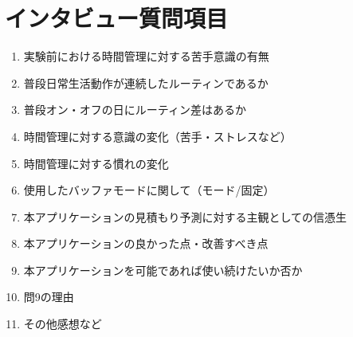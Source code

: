 \chapter{インタビュー質問項目}
  \begin{enumerate}
  \item 実験前における時間管理に対する苦手意識の有無
  \item 普段日常生活動作が連続したルーティンであるか
  \item 普段オン・オフの日にルーティン差はあるか
  \item 時間管理に対する意識の変化（苦手・ストレスなど）
  \item 時間管理に対する慣れの変化 
 \item 使用したバッファモードに関して（モード/固定）
  \item 本アプリケーションの見積もり予測に対する主観としての信憑生
  \item 本アプリケーションの良かった点・改善すべき点
  \item 本アプリケーションを可能であれば使い続けたいか否か
  \item 問9の理由
  \item その他感想など
\end{enumerate}